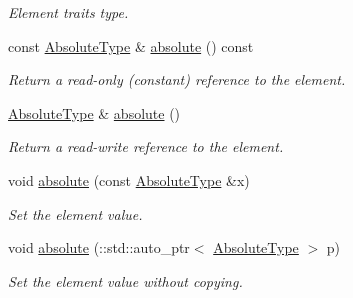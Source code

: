 \begin{DoxyCompactItemize}
\begin{DoxyCompactList}\small\item\em Element traits type. \item\end{DoxyCompactList}\item 
const \hyperlink{classopenstack_1_1xml_1_1AbsoluteLimits}{AbsoluteType} \& \hyperlink{classopenstack_1_1xml_1_1Limits_a92add62fda7bfdd3e5fd42134a63af37}{absolute} () const 
\begin{DoxyCompactList}\small\item\em Return a read-\/only (constant) reference to the element. \item\end{DoxyCompactList}\item 
\hyperlink{classopenstack_1_1xml_1_1AbsoluteLimits}{AbsoluteType} \& \hyperlink{classopenstack_1_1xml_1_1Limits_a22707d32260bdc81077782a9edbcf3bb}{absolute} ()
\begin{DoxyCompactList}\small\item\em Return a read-\/write reference to the element. \item\end{DoxyCompactList}\item 
void \hyperlink{classopenstack_1_1xml_1_1Limits_a9e288f7dc7f3d8fe315c1ad88422ad35}{absolute} (const \hyperlink{classopenstack_1_1xml_1_1AbsoluteLimits}{AbsoluteType} \&x)
\begin{DoxyCompactList}\small\item\em Set the element value. \item\end{DoxyCompactList}\item 
void \hyperlink{classopenstack_1_1xml_1_1Limits_ac5da5985c3002297080a395837396ab0}{absolute} (::std::auto\_\-ptr$<$ \hyperlink{classopenstack_1_1xml_1_1AbsoluteLimits}{AbsoluteType} $>$ p)
\begin{DoxyCompactList}\small\item\em Set the element value without copying. \item\end{DoxyCompactList}\end{DoxyCompactItemize}
